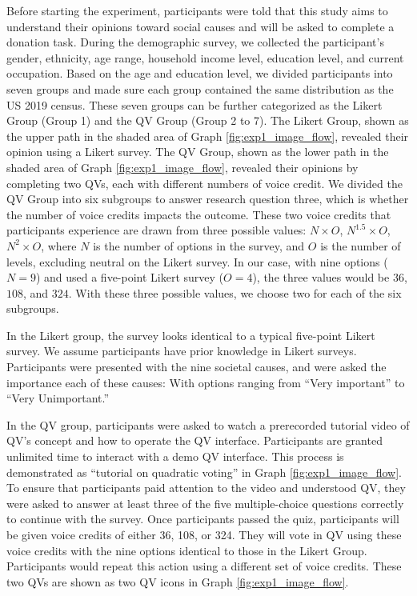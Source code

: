 Before starting the experiment,
participants were told that 
this study aims to understand their opinions 
toward social causes and will be asked to complete a donation task.
During the demographic survey, 
we collected the participant's gender, ethnicity, age range, household income level, 
education level, and current occupation.
Based on the age and education level,
we divided participants into seven groups
and made sure each group contained the same distribution
as the US 2019 census.
These seven groups can be further categorized as
the Likert Group (Group 1) and the QV Group (Group 2 to 7).
The Likert Group, shown as the upper path in the shaded area of Graph \ref{fig:exp1_image_flow}, 
revealed their opinion using a Likert survey.
The QV Group, shown as the lower path in the shaded area of Graph \ref{fig:exp1_image_flow}, 
revealed their opinions by completing two QVs, each with different numbers of voice credit.
We divided the QV Group into six subgroups
to answer research question three, 
which is whether the number of voice credits impacts the outcome.
These two voice credits that participants experience 
are drawn from three possible values: $N \times O$, $N^1.5 \times O$, $N^2 \times O$, 
where $N$ is the number of options in the survey, 
and $O$ is the number of levels, 
excluding neutral on the Likert survey. %
In our case, with nine options ($N=9$) and
used a five-point Likert survey ($O=4$), 
the three values would be $36$, $108$, and $324$.
With these three possible values, 
we choose two for each of the six subgroups.

In the Likert group, 
the survey looks identical to a typical five-point Likert survey.
We assume participants have prior knowledge in Likert surveys.
Participants were presented with the nine societal causes, 
and were asked the importance each of these causes: 
With options ranging from ``Very important'' to ``Very Unimportant.''

In the QV group, 
participants were asked to watch 
a prerecorded tutorial video of QV's concept 
and how to operate the QV interface.
Participants are granted unlimited time 
to interact with a demo QV interface. 
This process is demonstrated as 
``tutorial on quadratic voting'' 
in Graph \ref{fig:exp1_image_flow}.
To ensure that participants paid attention to the video and understood QV, 
they were asked to answer at least three of the five multiple-choice questions 
correctly to continue with the survey.
Once participants passed the quiz, 
participants will be given voice credits of either 36, 108, or 324.
They will vote in QV using these voice credits 
with the nine options identical to those in the Likert Group.
Participants would repeat this action using a different set of voice credits.
These two QVs are shown as two QV icons in Graph \ref{fig:exp1_image_flow}.



